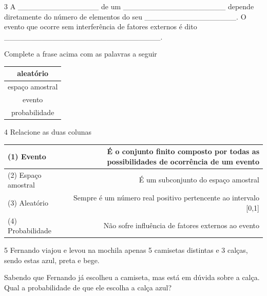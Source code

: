 {{{\begin{escolha}
{{{{\begin{escolha}
\begin{escolha}
{{\begin{enumerate}
{{\num{3} A \_\_\_\_\_\_\_\_\_\_\_\_\_\_\_ de um
\_\_\_\_\_\_\_\_\_\_\_\_\_\_\_\_\_\_\_ depende diretamente do número de
elementos do seu \_\_\_\_\_\_\_\_\_\_\_\_\_\_\_\_\_. O evento que ocorre
sem interferência de fatores externos é dito
\_\_\_\_\_\_\_\_\_\_\_\_\_\_\_\_\_\_\_\_\_\_\_\_\_\_\_\_\_.

Complete a frase acima com as palavras a seguir

\begin{table}[]
\begin{tabular}{|c|}
\hline
aleatório \\ \hline
espaço amostral \\ \hline
evento \\ \hline
probabilidade \\ \hline
\end{tabular}
\end{table}


\num{4} Relacione as duas colunas

\begin{table}[]
\begin{tabular}{|l|r|}
\hline
(1) Evento & É o conjunto finito composto por todas as possibilidades de ocorrência de um evento \\ \hline
(2) Espaço amostral & É um subconjunto do espaço amostral \\ \hline
(3) Aleatório & Sempre é um número real positivo pertencente ao intervalo {[}0,1{]} \\ \hline
(4) Probabilidade & Não sofre influência de fatores externos ao evento \\ \hline
\end{tabular}
\end{table}


\num{5} Fernando viajou e levou na mochila apenas 5 camisetas distintas e 3
calças, sendo estas azul, preta e bege.

Sabendo que Fernando já escolheu a camiseta, mas está em dúvida sobre a
calça. Qual a probabilidade de que ele escolha a calça azul?



}}
\end{enumerate}}}
\end{escolha}
\end{escolha}}}}}
\end{escolha}}}}
